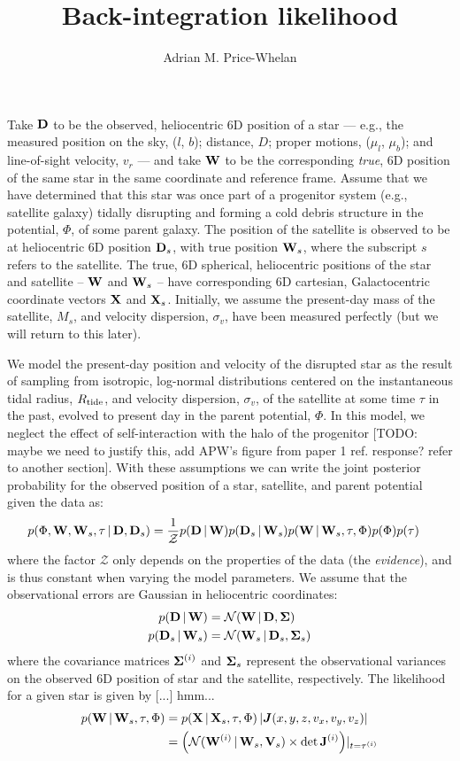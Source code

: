 \documentclass[letterpaper,12pt,preprint]{aastex}
\newcommand{\given}{\,|\,}
\newcommand{\jac}[1]{\left\vert \J{#1} \right\vert}
\newcommand{\D}{{\bf D}}
\newcommand{\W}{{\bf W}}
\newcommand{\X}{{\bf X}}
\newcommand{\V}{{\bf V}}
\newcommand{\J}{{\boldsymbol J}}
\newcommand{\bSigma}{{\bf \Sigma}}
\begin{document}
\title{Back-integration likelihood}
\author{Adrian M. Price-Whelan}

Take $\D$ to be the observed, heliocentric 6D position of a star --- e.g., the measured position on the sky, ($l$, $b$); distance, $D$; proper motions, ($\mu_l$, $\mu_b$); and line-of-sight velocity, $v_r$ --- and take $\W$ to be the corresponding \emph{true}, 6D position of the same star in the same coordinate and reference frame. Assume that we have determined that this star was once part of a progenitor system (e.g., satellite galaxy) tidally disrupting and forming a cold debris structure in the potential, $\Phi$, of some parent galaxy. The position of the satellite is observed to be at heliocentric 6D position $\D_s$, with true position $\W_s$, where the subscript $s$ refers to the satellite. The true, 6D spherical, heliocentric positions of the star and satellite -- $\W$ and $\W_s$ -- have corresponding 6D cartesian, Galactocentric coordinate vectors $\X$ and $\X_s$. Initially, we assume the present-day mass of the satellite, $M_s$, and velocity dispersion, $\sigma_v$, have been measured perfectly (but we will return to this later).

We model the present-day position and velocity of the disrupted star as the result of sampling from isotropic, log-normal distributions centered on the instantaneous tidal radius, $R_{\rm tide}$, and velocity dispersion, $\sigma_v$, of the satellite at some time $\tau$ in the past, evolved to present day in the parent potential, $\Phi$. In this model, we neglect the effect of self-interaction with the halo of the progenitor [TODO: maybe we need to justify this, add APW's figure from paper 1 ref. response? refer to another section]. With these assumptions we can write the joint posterior probability for the observed position of a star, satellite, and parent potential given the data as:
\begin{align}
	p(\Phi, \W, \W_s, \tau \given \D, \D_s) &= \frac{1}{\mathcal{Z}} p(\D \given \W) p(\D_s \given \W_s) 
												       p(\W \given \W_s, \tau, \Phi) 
												       p(\Phi) p(\tau)
\end{align}
where the factor $\mathcal{Z}$ only depends on the properties of the data (the \emph{evidence}), and is thus constant when varying the model parameters. We assume that the observational errors are Gaussian in heliocentric coordinates:
\begin{align}
	p(\D \given \W) &= \mathcal{N}(\W \given \D, \bSigma)\\
	p(\D_s \given \W_s) &= \mathcal{N}(\W_s \given \D_s, \bSigma_s)
\end{align}
where the covariance matrices $\bSigma^{(i)}$ and $\bSigma_s$ represent the observational variances on the observed 6D position of star and the satellite, respectively. The likelihood for a given star is given by  [...] hmm...
\begin{align}
	p(\W \given \W_s, \tau, \Phi) &= p(\X \given \X_s, \tau, \Phi) \jac{(x,y,z,v_x,v_y,v_z)}\\
	&= \left(\mathcal{N}(\W^{(i)} \given \W_s, \V_s) \times \det{\bf J}^{(i)}\right)\rvert_{t=\tau^{(i)}}
\end{align}
\end{document}
